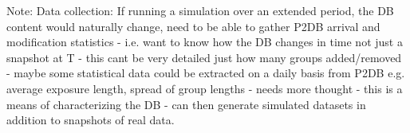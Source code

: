 Note: Data collection: If running a simulation over an extended period, the DB content would naturally change, need to be able to gather P2DB arrival and modification statistics - i.e. want to know how the DB changes in time not just a snapshot at T - this cant be very detailed just how many groups added/removed - maybe some statistical data could be extracted on a daily basis from P2DB e.g. average exposure length, spread of group lengths - needs more thought - this is a means of characterizing the DB - can then generate simulated datasets in addition to snapshots of real data. 

